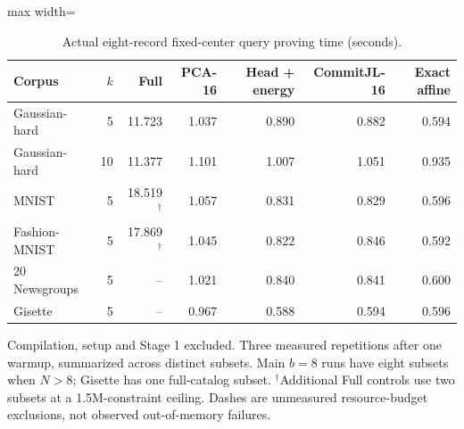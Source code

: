 \begin{table}[tp]
\caption{Actual eight-record fixed-center query proving time (seconds).}\label{tab:zkperf-a}
\centering\small
\begin{adjustbox}{max width=\textwidth}
\begin{tabular}{@{}lrrrrrr@{}}
\toprule
Corpus & $k$ & Full & PCA-16 & Head + energy & CommitJL-16 & Exact affine \\
\midrule
Gaussian-hard & 5 & 11.723 & 1.037 & 0.890 & 0.882 & 0.594 \\
Gaussian-hard & 10 & 11.377 & 1.101 & 1.007 & 1.051 & 0.935 \\
MNIST & 5 & 18.519$^{\dagger}$ & 1.057 & 0.831 & 0.829 & 0.596 \\
Fashion-MNIST & 5 & 17.869$^{\dagger}$ & 1.045 & 0.822 & 0.846 & 0.592 \\
20 Newsgroups & 5 & -- & 1.021 & 0.840 & 0.841 & 0.600 \\
Gisette & 5 & -- & 0.967 & 0.588 & 0.594 & 0.596 \\
\bottomrule
\end{tabular}
\end{adjustbox}
\par\vspace{3pt}\begin{minipage}{0.98\textwidth}\footnotesize Compilation, setup and Stage 1 excluded. Three measured repetitions after one warmup, summarized across distinct subsets. Main $b=8$ runs have eight subsets when $N>8$; Gisette has one full-catalog subset. $^{\dagger}$Additional Full controls use two subsets at a 1.5M-constraint ceiling. Dashes are unmeasured resource-budget exclusions, not observed out-of-memory failures.\end{minipage}
\end{table}
